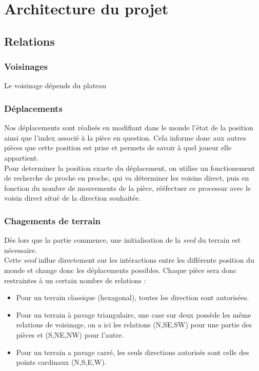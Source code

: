 \chapter{Architecture du projet}
\section{Relations}
    \subsection{Voisinages}
        Le voisinage dépends du plateau 
        
    \subsection{Déplacements}
        Nos déplacements sont réalisés en modifiant dans le monde l'état de la position ainsi que l'index associé à la pièce en question. Cela informe donc aux autres pièces que cette position est prise et permets de savoir à quel joueur elle appartient.\\
        Pour determiner la position exacte du déplacement, on utilise un fonctionement de recherche de proche en proche, qui va déterminer les voisins direct, puis en fonction du nombre de mouvements de la pièce, rééfectuer ce processur avec le voisin direct situé de la direction souhaitée.
        
    \subsection{Chagements de terrain}
        Dès lors que la partie commence, une initialisation de la \textit{seed} du terrain est nécessaire. \\
        Cette \textit{seed} influe directement sur les intéractions entre les différente position du monde et change donc les déplacements possibles. Chaque pièce sera donc restraintes à un certain nombre de relations : \\
        
        \begin{itemize}
            \item Pour un terrain classique (hexagonal), toutes les direction sont autorisées.\\
            \item Pour un terrain à pavage triangulaire, une case sur deux possède les même relations de voisinage, on a ici les relations (N,SE,SW) pour une partie des pièces et (S,NE,NW) pour l'autre. \\
            \item Pour un terrain a pavage carré, les seuls directions autorisés sont celle des points cardinaux (N,S,E,W). \\ 
        \end{itemize}
        
